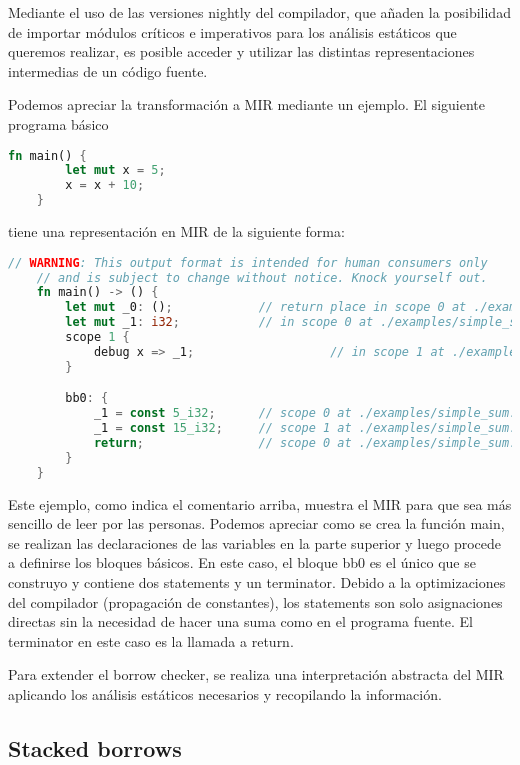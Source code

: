 Mediante el uso de las versiones nightly del compilador, que añaden la posibilidad de importar módulos críticos e imperativos para los análisis estáticos que queremos realizar, es posible acceder y utilizar las distintas representaciones intermedias de un código fuente.

Podemos apreciar la transformación a MIR mediante un ejemplo. El siguiente programa básico
\begin{lstlisting}[language=Rust]
    fn main() {
        let mut x = 5;
        x = x + 10;
    }
\end{lstlisting}
tiene una representación en MIR de la siguiente forma:
\begin{lstlisting}[language=Rust]
    // WARNING: This output format is intended for human consumers only
    // and is subject to change without notice. Knock yourself out.
    fn main() -> () {
        let mut _0: ();            // return place in scope 0 at ./examples/simple_sum.rs:1:11: 1:11
        let mut _1: i32;           // in scope 0 at ./examples/simple_sum.rs:2:9: 2:14
        scope 1 {
            debug x => _1;                   // in scope 1 at ./examples/simple_sum.rs:2:9: 2:14
        }

        bb0: {
            _1 = const 5_i32;      // scope 0 at ./examples/simple_sum.rs:2:17: 2:18
            _1 = const 15_i32;     // scope 1 at ./examples/simple_sum.rs:3:5: 3:15
            return;                // scope 0 at ./examples/simple_sum.rs:4:2: 4:2
        }
    }
\end{lstlisting}

Este ejemplo, como indica el comentario arriba, muestra el MIR para que sea más sencillo de leer por las personas. Podemos apreciar como se crea la función main, se realizan las declaraciones de las variables en la parte superior y luego procede a definirse los bloques básicos. En este caso, el bloque bb0 es el único que se construyo y contiene dos statements y un terminator. Debido a la optimizaciones del compilador (propagación de constantes), los statements son solo asignaciones directas sin la necesidad de hacer una suma como en el programa fuente. El terminator en este caso es la llamada a return.

Para extender el borrow checker, se realiza una interpretación abstracta del MIR aplicando los análisis estáticos necesarios y recopilando la información.

\subsection{Stacked borrows}

